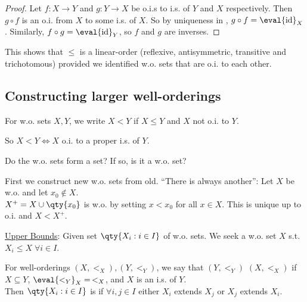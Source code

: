 \begin{proof}
    Let $f \colon X \to Y$ and $g \colon Y \to X$ be o.i.s to i.s. of $Y$ and $X$ respectively.
    Then $g \circ f$ is an o.i. from $X$ to some i.s. of $X$.
    So by uniqueness in , $g \circ f = \eval{\operatorname{id}}_X$.
    Similarly, $f \circ g = \eval{\operatorname{id}}_Y$, so $f$ and $g$ are inverses.
\end{proof}

\begin{remark}
    This shows that $\leq$ is a linear-order (reflexive, antisymmetric, transitive and trichotomous) provided we identified w.o. sets that are o.i. to each other. \\
\end{remark}

\subsection{Constructing larger well-orderings}

\begin{definition}
    For w.o. sets $X, Y$, we write $X < Y$ if $X \leq Y$ and $X$ not o.i. to $Y$.
\end{definition}
So $X < Y \iff X$ o.i. to a proper i.s. of $Y$.

\begin{question}
    Do the w.o. sets form a set? If so, is it a w.o. set?
\end{question}

\begin{answer}
    First we construct new w.o. sets from old.
    ``There is always another'': Let $X$ be w.o. and let $x_0 \not\in X$. \\
    $X^+ = X \cup \qty{x_0}$ is w.o. by setting $x < x_0$ for all $x \in X$.
    This is unique up to o.i. and $X < X^+$.
\end{answer}

\underline{Upper Bounds}: Given set $\qty{X_i : i \in I}$ of w.o. sets.
We seek a w.o. set $X$ s.t. $X_i \leq X \; \forall i \in I$.

\begin{definition}[Extends]
    For well-orderings $(X, <_X), (Y, <_Y)$, we say that $(Y, <_Y)$  $(X, <_X)$ if $X \subseteq Y$, $\eval{<_Y}_{X} =\, <_X$, and $X$ is an i.s. of $Y$. \\
    Then $\qty{X_i : i \in I}$ is  if $\forall i, j \in I$ either $X_i$ extends $X_j$ or $X_j$ extends $X_i$.
\end{definition}

